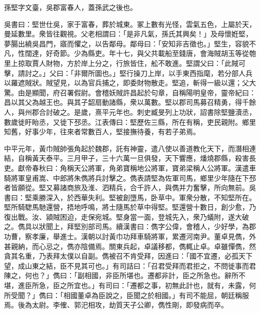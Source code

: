 
\begin{pinyinscope}
孫堅字文臺，吳郡富春人，蓋孫武之後也。

吳書曰：堅世仕吳，家于富春，葬於城東。冢上數有光怪，雲氣五色，上屬於天，曼延數里。衆皆往觀視。父老相謂曰：「是非凡氣，孫氏其興矣！」及母懷姙堅，夢腸出繞吳昌門，寤而懼之，以告鄰母。鄰母曰：「安知非吉徵也。」堅生，容貌不凡，性闊達，好奇節。少為縣吏。年十七，與父共載船至錢唐，會海賊胡玉等從匏里上掠取賈人財物，方於岸上分之，行旅皆住，舩不敢進。堅謂父曰：「此賊可擊，請討之。」父曰：「非爾所圖也。」堅行操刀上岸，以手東西指麾，若分部人兵以羅遮賊狀。賊望見，以為官兵捕之，即委財物散走。堅追，斬得一級以還；父大驚。由是顯聞，府召署假尉。會稽妖賊許昌起於句章，自稱陽明皇帝，靈帝紀曰：昌以其父為越王也。與其子韶扇動諸縣，衆以萬數。堅以郡司馬募召精勇，得千餘人，與州郡合討破之。是歲，熹平元年也。刺史臧旻列上功狀，詔書除堅鹽瀆丞，數歲徙盱眙丞，又徙下邳丞。江表傳曰：堅歷佐三縣，所在有稱，吏民親附。鄉里知舊，好事少年，往來者常數百人，堅接撫待養，有若子弟焉。

中平元年，黃巾賊帥張角起於魏郡，託有神靈，遣八使以善道教化天下，而潛相連結，自稱黃天泰平。三月甲子，三十六萬一旦俱發，天下響應，燔燒郡縣，殺害長吏。獻帝春秋曰：角稱天公將軍，角弟寶稱地公將軍，寶弟梁稱人公將軍。漢遣車騎將軍皇甫嵩、中郎將朱儁將兵討擊之。儁表請堅為佐軍司馬，鄉里少年隨在下邳者皆願從。堅又募諸商旅及淮、泗精兵，合千許人，與儁并力奮擊，所向無前。吳書曰：堅乘勝深入，於西華失利。堅被創墮馬，卧草中。軍衆分散，不知堅所在。堅所騎騘馬馳還營，捂地呼鳴，將士隨馬於草中得堅。堅還營十數日，創少愈，乃復出戰。汝、潁賊困迫，走保宛城。堅身當一面，登城先入，衆乃蟻附，遂大破之。儁具以狀聞上，拜堅別部司馬。續漢書曰：儁字公偉，會稽人，少好學，為郡功曹，察孝廉，舉進士。漢朝以討黃巾功拜車騎將軍，累遷河南尹。董卓見儁，外甚親納，而心忌之，儁亦陰備焉。關東兵起，卓議移都，儁輒止卓。卓雖憚儁，然貪其名重，乃表拜太僕以自副。儁被召不肯受拜，因進曰：「國不宜遷，必孤天下望，成山東之結，臣不見其可也。」有司詰曰：「召君受拜而君拒之，不問徙事而君陳之，何也？」儁曰：「副相國，非臣所堪也。遷都非計，臣之所急也。辭所不堪，進臣所急，臣之所宜也。」有司曰：「遷都之事，初無此計也，就有，未露，何所受聞？」儁曰：「相國董卓為臣說之，臣聞之於相國。」有司不能屈，朝廷稱服焉。後為太尉。李傕、郭汜相攻，劫質天子公卿，儁性剛，即發病而卒。


\end{pinyinscope}
